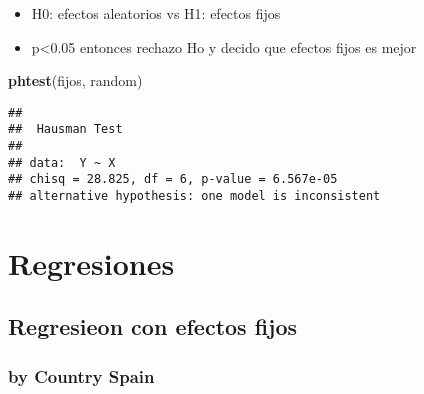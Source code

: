 \documentclass[
]{article}
\newenvironment{Shaded}{\begin{snugshade}}{\end{snugshade}}
\newcommand{\FunctionTok}[1]{\textcolor[rgb]{0.13,0.29,0.53}{\textbf{#1}}}
\newcommand{\NormalTok}[1]{#1}
\providecommand{\tightlist}{%
  \setlength{\itemsep}{0pt}\setlength{\parskip}{0pt}}
\begin{document}
\begin{itemize}
\tightlist
\item
  H0: efectos aleatorios vs H1: efectos fijos
\item
  p\textless0.05 entonces rechazo Ho y decido que efectos fijos es mejor
\end{itemize}

\begin{Shaded}
\begin{Highlighting}[]
\FunctionTok{phtest}\NormalTok{(fijos, random)}
\end{Highlighting}
\end{Shaded}

\begin{verbatim}
## 
##  Hausman Test
## 
## data:  Y ~ X
## chisq = 28.825, df = 6, p-value = 6.567e-05
## alternative hypothesis: one model is inconsistent
\end{verbatim}

\section{Regresiones}\label{regresiones}

\subsection{Regresieon con efectos
fijos}\label{regresieon-con-efectos-fijos}

\subsubsection{by Country Spain}\label{by-country-spain}
\end{document}

